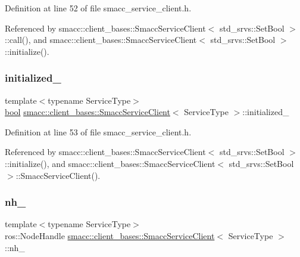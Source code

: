 Definition at line 52 of file smacc\+\_\+service\+\_\+client.\+h.



Referenced by smacc\+::client\+\_\+bases\+::\+Smacc\+Service\+Client$<$ std\+\_\+srvs\+::\+Set\+Bool $>$\+::call(), and smacc\+::client\+\_\+bases\+::\+Smacc\+Service\+Client$<$ std\+\_\+srvs\+::\+Set\+Bool $>$\+::initialize().

\mbox{\label{classsmacc_1_1client__bases_1_1SmaccServiceClient_ad36816c62fc14380a6d0782a2592a5b4}} 
\subsubsection{\texorpdfstring{initialized\+\_\+}{initialized\_}}
{\footnotesize\ttfamily template$<$typename Service\+Type$>$ \\
\hyperlink{classbool}{bool} \hyperlink{classsmacc_1_1client__bases_1_1SmaccServiceClient}{smacc\+::client\+\_\+bases\+::\+Smacc\+Service\+Client}$<$ Service\+Type $>$\+::initialized\+\_\+\hspace{0.3cm}{\ttfamily [protected]}}



Definition at line 53 of file smacc\+\_\+service\+\_\+client.\+h.



Referenced by smacc\+::client\+\_\+bases\+::\+Smacc\+Service\+Client$<$ std\+\_\+srvs\+::\+Set\+Bool $>$\+::initialize(), and smacc\+::client\+\_\+bases\+::\+Smacc\+Service\+Client$<$ std\+\_\+srvs\+::\+Set\+Bool $>$\+::\+Smacc\+Service\+Client().

\mbox{\label{classsmacc_1_1client__bases_1_1SmaccServiceClient_afb62982383b8269c7962cd1588537489}} 
\subsubsection{\texorpdfstring{nh\+\_\+}{nh\_}}
{\footnotesize\ttfamily template$<$typename Service\+Type$>$ \\
ros\+::\+Node\+Handle \hyperlink{classsmacc_1_1client__bases_1_1SmaccServiceClient}{smacc\+::client\+\_\+bases\+::\+Smacc\+Service\+Client}$<$ Service\+Type $>$\+::nh\+\_\+\hspace{0.3cm}{\ttfamily [protected]}}



